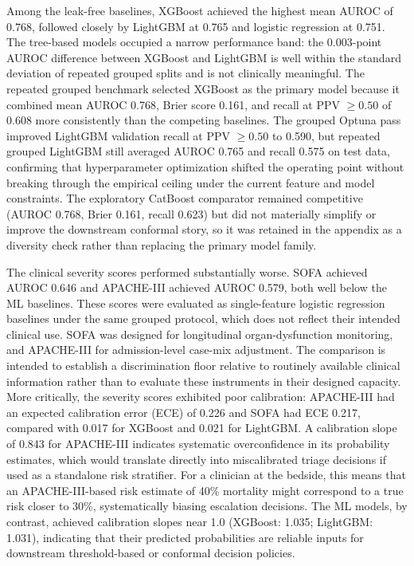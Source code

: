 Among the leak-free baselines, XGBoost achieved the highest mean AUROC of 0.768, followed closely by LightGBM at 0.765 and logistic regression at 0.751. The tree-based models occupied a narrow performance band: the 0.003-point AUROC difference between XGBoost and LightGBM is well within the standard deviation of repeated grouped splits and is not clinically meaningful. The repeated grouped benchmark selected XGBoost as the primary model because it combined mean AUROC 0.768, Brier score 0.161, and recall at PPV $\geq 0.50$ of 0.608 more consistently than the competing baselines. The grouped Optuna pass\cite{Akiba2019} improved LightGBM validation recall at PPV $\geq 0.50$ to 0.590, but repeated grouped LightGBM still averaged AUROC 0.765 and recall 0.575 on test data, confirming that hyperparameter optimization shifted the operating point without breaking through the empirical ceiling under the current feature and model constraints. The exploratory CatBoost\cite{Prokhorenkova2018} comparator remained competitive (AUROC 0.768, Brier 0.161, recall 0.623) but did not materially simplify or improve the downstream conformal story, so it was retained in the appendix as a diversity check rather than replacing the primary model family.

The clinical severity scores performed substantially worse. SOFA\cite{Vincent1996} achieved AUROC 0.646 and APACHE-III\cite{Knaus1991} achieved AUROC 0.579, both well below the ML baselines. These scores were evaluated as single-feature logistic regression baselines under the same grouped protocol, which does not reflect their intended clinical use. SOFA was designed for longitudinal organ-dysfunction monitoring, and APACHE-III for admission-level case-mix adjustment. The comparison is intended to establish a discrimination floor relative to routinely available clinical information rather than to evaluate these instruments in their designed capacity. More critically, the severity scores exhibited poor calibration: APACHE-III had an expected calibration error (ECE) of 0.226 and SOFA had ECE 0.217, compared with 0.017 for XGBoost and 0.021 for LightGBM. A calibration slope of 0.843 for APACHE-III indicates systematic overconfidence in its probability estimates, which would translate directly into miscalibrated triage decisions if used as a standalone risk stratifier. For a clinician at the bedside, this means that an APACHE-III-based risk estimate of 40\% mortality might correspond to a true risk closer to 30\%, systematically biasing escalation decisions. The ML models, by contrast, achieved calibration slopes near 1.0 (XGBoost: 1.035; LightGBM: 1.031), indicating that their predicted probabilities are reliable inputs for downstream threshold-based or conformal decision policies.

